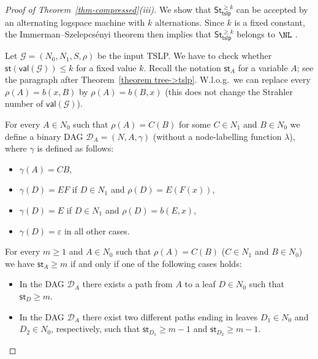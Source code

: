 \documentclass[a4paper,UKenglish,cleveref, autoref, thm-restate, numberwithinsect]{lipics-v2021}
\newcommand{\val}{\mathsf{val}}
\newcommand{\hs}{\mathsf{st}}
\newcommand{\StNk}{\mathsf{St}^{\ge k}}
\newcommand{\StNktslp}{\StNk_{\mathsf{tslp}}}
\begin{document}
\begin{proof}[Proof of Theorem~\ref{thm-compressed}(iii)]
We show that $\StNktslp$ can be accepted by an alternating logspace machine with $k$ alternations.
Since $k$ is a fixed constant, the Immerman--Szelepcsényi
theorem then implies that $\StNktslp$ belongs to $\NL$ \cite[Corollary~2]{Imm88}. 

Let $\mathcal{G} = (N_0, N_1, S, \rho)$ be the input TSLP. We have to check whether 
$\hs(\val(\mathcal{G})) \le k$ for a fixed value $k$. 
Recall the notation $\hs_A$ for a variable $A$; see the paragraph after 
Theorem~\ref{theorem tree->tslp}. W.l.o.g.~we can replace every $\rho(A) = b(x,B)$ by $\rho(A) = b(B,x)$ (this does not 
change the Strahler number of $\val(\mathcal{G})$).


For every $A \in N_0$ such that $\rho(A) = C(B)$ for some $C \in N_1$ and $B \in N_0$
we define a binary DAG 
$\mathcal{D}_A = (N, A, \gamma)$ (without a node-labelling function $\lambda$),
where $\gamma$ is defined as follows:
\begin{itemize}
\item $\gamma(A) = CB$,
\item $\gamma(D) = EF$ if $D \in N_1$ and $\rho(D) = E(F(x))$,
\item $\gamma(D) = E$ if $D \in N_1$ and $\rho(D) = b(E,x)$,
\item $\gamma(D) = \varepsilon$ in all other cases.
\end{itemize}

\begin{claim} \label{claim-NL} 
For every $m \geq 1$ and $A \in N_0$ such that $\rho(A) = C(B)$ ($C \in N_1$ and $B \in N_0$)
we have $\hs_A \geq m$ if and only if one of the following cases holds:
\begin{itemize}
\item In the DAG $\mathcal{D}_A$ there exists a path from $A$ to a leaf $D \in N_0$ such that $\hs_D \geq m$.
\item In the DAG $\mathcal{D}_A$ there exist two different paths  ending in leaves $D_1 \in N_0$ and $D_2 \in N_0$, respectively,
such that $\hs_{D_1} \geq m-1$ and $\hs_{D_2} \geq m-1$.
\end{itemize} 
\end{claim}



\end{proof}
\end{document}
